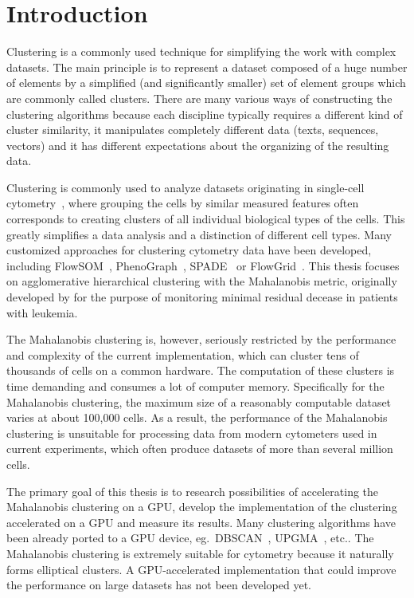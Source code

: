 \chapter*{Introduction}

Clustering is a commonly used technique for simplifying the work with complex data\-sets.
The main principle is to represent a dataset composed of a huge number of elements by a simplified (and significantly smaller) set of element groups which are commonly called clusters.
There are many various ways of constructing the clustering algorithms because each discipline typically requires a different kind of cluster similarity, it manipulates completely different data (texts, sequences, vectors) and it has different expectations about the organizing of the resulting data.

Clustering is commonly used to analyze datasets originating in single-cell cytometry~\cite{shapiro2005practical}, where grouping the cells by similar measured features often corresponds to creating clusters of all individual biological types of the cells. This greatly simplifies a data analysis and a distinction of different cell types. Many customized approaches for clustering cytometry data have been developed, including FlowSOM~\cite{van2015flowsom}, PhenoGraph~\cite{levine2015data}, SPADE~\cite{qiu2011extracting} or FlowGrid~\cite{ye2019ultrafast}. This thesis focuses on agglomerative hierarchical clustering with the Mahalanobis metric, originally developed by \citet{fivser2012detection} for the purpose of monitoring minimal residual decease in patients with leukemia. 

The Mahalanobis clustering is, however, seriously restricted by the performance and complexity of the current implementation, which can cluster tens of thousands of cells on a common hardware.
The computation of these clusters is time demanding and consumes a lot of computer memory. Spe\-cifically for the Mahalanobis clustering, the maximum size of a reasonably computable dataset varies at about 100,000 cells. As a result, the performance of the Mahalanobis clustering is unsuitable for processing data from modern cytometers used in current experiments, which often produce datasets of more than several million cells.

The primary goal of this thesis is to research possibilities of accelerating the Mahalanobis clustering on a GPU, develop the implementation of the clustering accelerated on a GPU and measure its results. Many clustering algorithms have been already ported to a GPU device, eg.~DBSCAN~\cite{andrade2013g}, UPGMA~\cite{hua2017mgupgma}, etc.. The Mahalanobis clustering is extremely suitable for cytometry because it naturally forms elliptical clusters. A GPU-accelerated implementation that could improve the performance on large datasets has not been developed yet.

